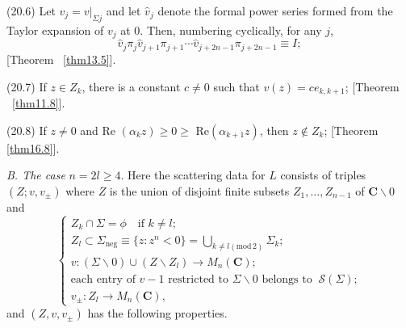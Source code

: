 \documentclass{surv-l}
\theoremstyle{plain}
\theoremstyle{definition}
\numberwithin{equation}{chapter}
\begin{document}
(20.6) Let $v_{j}=v|_{\Sigma j}$ and let $\hat{v}_{j}$ denote the formal power series formed from the Taylor expansion of $v_{j}$ at 0. Then, numbering cyclically, for any $j$,
\begin{equation*}
\hat{v}_{j}\pi_{j}\hat{v}_{j+1}\pi_{j+1}\cdots\hat{v}_{j+2n-1} \pi_{j+2n-1}\equiv I;
\end{equation*}
[Theorem ~\ref{thm13.5}].

(20.7) If $z \in Z_{k}$, there is a constant $c\neq 0$ such that $v(z)=ce_{k,k+1}$; [Theorem ~\ref{thm11.8}].

(20.8) If $z\neq 0$ and  Re $(\alpha_{k}z)\geq 0\geq$ Re$(\alpha_{k+1}z)$, then $z\not\in Z_{k}$; [Theorem \ref{thm16.8}].

\emph{B. The case} $n=2l\geq 4$. Here the scattering data for $L$ consists of triples $(Z;v, v_{\pm})$ where $Z$ is the union of disjoint finite subsets $Z_{1},\ldots, Z_{n-1}$ of $\mathbf{C}\backslash 0$ and
\setcounter{equation}{8}
\begin{equation}\label{eq20.9}
\left\{\begin{array}{l}
Z_{k}\cap\Sigma=\phi \quad \text{if } k\neq l;\\
Z_{l}\subset\Sigma_{\mathrm{neg}}\equiv\{z:z^{n}<0\}=\bigcup_{k\neq l(\mathrm{mod}\, 2)}\Sigma_{k};\\
v : (\Sigma\backslash 0)\cup(Z\backslash Z_{l})\rightarrow M_{n}(\mathbf{C});\\
\text{each entry of }v-1\text{ restricted to } \Sigma\backslash 0\text{ belongs to }\ \mathscr{S}(\Sigma);\\
v_{\pm}:Z_{l}\rightarrow M_{n}(\mathbf{C}),
\end{array}\right.
\end{equation}
and $(Z, v, v_{\pm})$ has the following properties.
\end{document}
